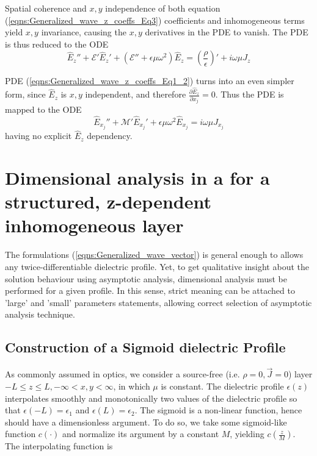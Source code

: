 \documentclass[twocolumn,secnumarabic,amssymb, nobibnotes, aps, prd]{revtex4-1}
\begin{document}
Spatial coherence and $x,y$ independence of both equation (\ref{eqns:Generalized_wave_z_coeffs_Eq3}) coefficients and inhomogeneous terms yield $x,y$ invariance, causing the $x,y$ derivatives in the PDE  to vanish. The PDE is thus reduced to the ODE
\begin{equation}
\hat{E}_z'' + \mathcal{E}' \hat{E}_z' + \left( \mathcal{E}'' + \epsilon \mu \omega^2 \right)\hat{E}_z   = \left( \frac{\rho}{\epsilon}\right)' + i \omega \mu J_z
\label{eqns:ODE_z_inhom}
\end{equation}

PDE (\ref{eqns:Generalized_wave_z_coeffs_Eq1_2})  turns into an even simpler form, since $\hat{E}_z$ is $x,y$ independent, and therefore  $\frac{\partial \hat{E}_z}{\partial {x_j}}=0$. Thus the  PDE is mapped to the ODE  
\begin{equation}
 \hat{E}_{x_j}''+\mathcal{M}' \hat{E}_{x_j}'  +\epsilon \mu \omega^2 \hat{E}_{x_j} = i \omega\mu J_{x_j}
\label{eqns:ODE_xy_inhom}
\end{equation}
having no explicit $\hat{E}_z$ dependency.



\section{Dimensional analysis in a for a structured, z-dependent inhomogeneous layer} 
The formulations (\ref{eqns:Generalized_wave_vector}) is general enough to allows any twice-differentiable dielectric profile. Yet,  to get qualitative insight about the solution behaviour using asymptotic analysis, dimensional analysis must be performed for a given profile. In this sense, strict meaning can be attached to 'large' and 'small' parameters statements, allowing correct selection of asymptotic analysis technique.  
\subsection{Construction of a Sigmoid dielectric Profile}
\label{sec:sigmoid_profile}
As commonly assumed in optics, we consider a source-free (i.e. $\rho=0, \overrightarrow{J}=0$) layer $-L \leq z \leq L, -\infty < x,y < \infty$, in  which $\mu$ is constant. The dielectric profile $\epsilon(z)$ interpolates smoothly and monotonically two values of the dielectric profile so that $\epsilon(-L)=\epsilon_1$ and $\epsilon(L)=\epsilon_2$. The sigmoid is a non-linear function, hence should have a dimensionless argument. To do so, we take some sigmoid-like function $c( \cdot )$ and normalize its argument  by  a constant $M$, yielding $c\left( \frac{z}{M}\right)$. The interpolating function is
\end{document}
